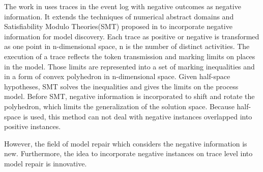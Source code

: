 The work in \cite{ponce2016incorporating} uses traces in the event log with negative outcomes as negative information. It extends the techniques of numerical abstract domains and Satisfiability Modulo Theories(SMT) proposed in \cite{carmona2014process} to incorporate negative information for model discovery. Each trace  as positive or negative is transformed as one point in n-dimensional space, n is the number of distinct activities. The execution of a trace reflects the token transmission and marking limits on places in the model. Those limits are represented into a set of marking inequalities and in a form of convex polyhedron in n-dimensional space. Given half-space hypotheses, SMT solves the inequalities and gives the limits on the process model. Before SMT, negative information is incorporated to shift and rotate the polyhedron, which limits the generalization of the solution space. Because half-space is used, this method can not deal with negative instances overlapped into positive instances.


However, the field of model repair which considers the negative information is new. Furthermore, the idea to incorporate negative instances on trace level into model repair is innovative.  

\iffalse
Compared to this, our approach is innovative mainly in the following aspects. 
\begin{itemize}
	\item Incorporate the negative information into model repair. 
	\item Analyze the long-term dependency in the model to provide a preciser result. 
	\item Analyze Model on Trace level. All activities constituting a trace are considered. 
\end{itemize}
\fi